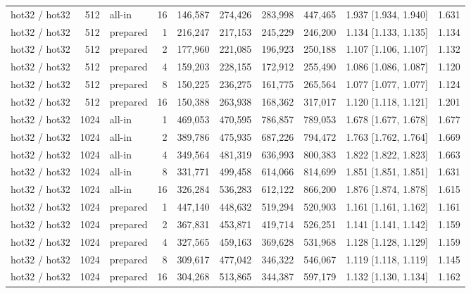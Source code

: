 \begin{table}[t]
{\begin{tabular}{lrlrrrrrlr}
hot32 / hot32 & 512 & all-in & 16 & 146{,}587 & 274{,}426 & 283{,}998 & 447{,}465 & 1.937 [1.934, 1.940] & 1.631 \\
hot32 / hot32 & 512 & prepared & 1 & 216{,}247 & 217{,}153 & 245{,}229 & 246{,}200 & 1.134 [1.133, 1.135] & 1.134 \\
hot32 / hot32 & 512 & prepared & 2 & 177{,}960 & 221{,}085 & 196{,}923 & 250{,}188 & 1.107 [1.106, 1.107] & 1.132 \\
hot32 / hot32 & 512 & prepared & 4 & 159{,}203 & 228{,}155 & 172{,}912 & 255{,}490 & 1.086 [1.086, 1.087] & 1.120 \\
hot32 / hot32 & 512 & prepared & 8 & 150{,}225 & 236{,}275 & 161{,}775 & 265{,}564 & 1.077 [1.077, 1.077] & 1.124 \\
hot32 / hot32 & 512 & prepared & 16 & 150{,}388 & 263{,}938 & 168{,}362 & 317{,}017 & 1.120 [1.118, 1.121] & 1.201 \\
hot32 / hot32 & 1024 & all-in & 1 & 469{,}053 & 470{,}595 & 786{,}857 & 789{,}053 & 1.678 [1.677, 1.678] & 1.677 \\
hot32 / hot32 & 1024 & all-in & 2 & 389{,}786 & 475{,}935 & 687{,}226 & 794{,}472 & 1.763 [1.762, 1.764] & 1.669 \\
hot32 / hot32 & 1024 & all-in & 4 & 349{,}564 & 481{,}319 & 636{,}993 & 800{,}383 & 1.822 [1.822, 1.823] & 1.663 \\
hot32 / hot32 & 1024 & all-in & 8 & 331{,}771 & 499{,}458 & 614{,}066 & 814{,}699 & 1.851 [1.851, 1.851] & 1.631 \\
hot32 / hot32 & 1024 & all-in & 16 & 326{,}284 & 536{,}283 & 612{,}122 & 866{,}200 & 1.876 [1.874, 1.878] & 1.615 \\
hot32 / hot32 & 1024 & prepared & 1 & 447{,}140 & 448{,}632 & 519{,}294 & 520{,}903 & 1.161 [1.161, 1.162] & 1.161 \\
hot32 / hot32 & 1024 & prepared & 2 & 367{,}831 & 453{,}871 & 419{,}714 & 526{,}251 & 1.141 [1.141, 1.142] & 1.159 \\
hot32 / hot32 & 1024 & prepared & 4 & 327{,}565 & 459{,}163 & 369{,}628 & 531{,}968 & 1.128 [1.128, 1.129] & 1.159 \\
hot32 / hot32 & 1024 & prepared & 8 & 309{,}617 & 477{,}042 & 346{,}322 & 546{,}067 & 1.119 [1.118, 1.119] & 1.145 \\
hot32 / hot32 & 1024 & prepared & 16 & 304{,}268 & 513{,}865 & 344{,}387 & 597{,}179 & 1.132 [1.130, 1.134] & 1.162 \\
\bottomrule
\end{tabular}}

\end{table}
